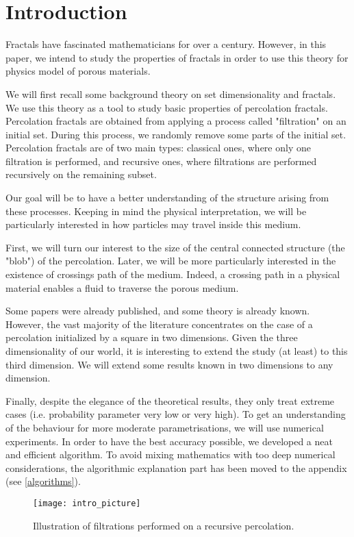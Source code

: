 \setcounter{section}{-1}
\section{Introduction}

Fractals have fascinated mathematicians for over a century.
However, in this paper, we intend to study the properties of fractals in order to use this theory for physics model of porous materials.

We will first recall some background theory on set dimensionality and fractals.
We use this theory as a tool to study basic properties of percolation fractals.
Percolation fractals are obtained from applying a process called "filtration" on an initial set.
During this process, we randomly remove some parts of the initial set.
Percolation fractals are of two main types: classical ones, where only one filtration is performed, and recursive ones, where filtrations are performed recursively on the remaining subset.

Our goal will be to have a better understanding of the structure arising from these processes.
Keeping in mind the physical interpretation, we will be particularly interested in how particles may travel inside this medium.

First, we will turn our interest to the size of the central connected structure (the "blob") of the percolation.
Later, we will be more particularly interested in the existence of crossings path of the medium.
Indeed, a crossing path in a physical material enables a fluid to traverse the porous medium.

Some papers were already published, and some theory is already known.
However, the vast majority of the literature concentrates on the case of a percolation initialized by a square in two dimensions.
Given the three dimensionality of our world, it is interesting to extend the study (at least) to this third dimension.
We will extend some results known in two dimensions to any dimension.

Finally, despite the elegance of the theoretical results, they only treat extreme cases (i.e. probability parameter very low or very high).
To get an understanding of the behaviour for more moderate parametrisations, we will use numerical experiments.
In order to have the best accuracy possible, we developed a neat and efficient algorithm.
To avoid mixing mathematics with too deep numerical considerations, the algorithmic explanation part has been moved to the appendix (see \ref{algorithms}).

\begin{figure}[!h]
	\texttt{[image: intro\_picture]}
	\centering
	\caption{Illustration of filtrations performed on a recursive percolation.}
	\label{fig:introRecursivePercolation}
\end{figure}


